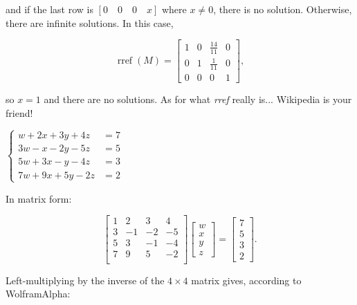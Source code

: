 \documentclass[../gatm_answers.tex]{subfiles}
\begin{document}
and if the last row is $[0\quad 0 \quad 0 \quad x]$ where $x \neq 0$, there is no solution. Otherwise, there are infinite solutions. In this case,

$$\operatorname{rref} (M) = \begin{bmatrix} 1 & 0 & \frac{14}{11} & 0 \\ 0 & 1 & \frac{1}{11} & 0 \\ 0 & 0 & 0 & 1 \end{bmatrix},$$

so $x=1$ and there are no solutions. As for what \textit{rref} really is... Wikipedia is your friend!

\begin{inner_problem}
\item $\begin{cases} w + 2x + 3y + 4z &= 7 \\ 3w-x-2y-5z&=5 \\ 5w+3x-y-4z&=3 \\ 7w+9x+5y-2z&=2\end{cases}$
\end{inner_problem}

In matrix form:

$$\begin{bmatrix}
1 & 2 & 3 & 4 \\
3 & -1 & -2 & -5 \\
5 & 3 & -1 & -4 \\
7 & 9 & 5 & -2 \\
\end{bmatrix}\begin{bmatrix} w \\ x \\ y \\ z \end{bmatrix} =
\begin{bmatrix}
  7 \\ 5 \\ 3 \\ 2
\end{bmatrix}.$$

Left-multiplying by the inverse of the $4\times 4$ matrix gives, according to WolframAlpha:
\end{document}
